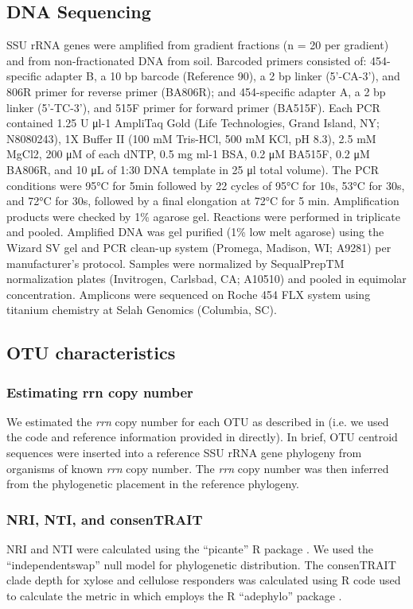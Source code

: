 \documentclass{article}
\begin{document}
\subsection{DNA Sequencing} 
SSU rRNA genes were amplified from gradient fractions (n = 20 per gradient) and
from non-fractionated DNA from soil. Barcoded primers consisted of:
454-specific adapter B, a 10 bp barcode (Reference 90), a 2 bp linker
(5’-CA-3’), and 806R primer for reverse primer (BA806R); and 454-specific
adapter A, a 2 bp linker (5’-TC-3’), and 515F primer for forward primer
(BA515F). Each PCR contained 1.25 U μl-1 AmpliTaq Gold (Life Technologies,
Grand Island, NY; N8080243), 1X Buffer II (100 mM Tris-HCl, 500 mM KCl, pH
8.3), 2.5 mM MgCl2, 200 μM of each dNTP, 0.5 mg ml-1 BSA, 0.2 μM BA515F, 0.2 μM
BA806R, and 10 μL of 1:30 DNA template in 25 μl total volume). The PCR
conditions were 95°C for 5min followed by 22 cycles of 95°C for 10s, 53°C for
30s, and 72°C for 30s, followed by a final elongation at 72°C for 5 min.
Amplification products were checked by 1\% agarose gel. Reactions were
performed in triplicate and pooled. Amplified DNA was gel purified (1\% low
melt agarose) using the Wizard SV gel and PCR clean-up system (Promega,
Madison, WI; A9281) per manufacturer’s protocol. Samples were normalized by
SequalPrepTM normalization plates (Invitrogen, Carlsbad, CA; A10510) and pooled
in equimolar concentration. Amplicons were sequenced on Roche 454 FLX system
using titanium chemistry at Selah Genomics (Columbia, SC).

\subsection{OTU characteristics} 
\subsubsection{Estimating rrn copy number}
We estimated the \textit{rrn} copy number for each OTU as described in \citet{Kembel_2012}
(i.e. we used the code and reference information provided in \citet{Kembel_2012}
directly). In brief, OTU centroid sequences were inserted into a reference SSU
rRNA gene phylogeny \citep{matsen2010} from organisms of known \textit{rrn} copy number.
The \textit{rrn} copy number was then inferred from the phylogenetic placement
in the reference phylogeny. 

\subsubsection{NRI, NTI, and consenTRAIT}
NRI and NTI were calculated using the ``picante'' R package
\citep{kembel2010}. We used the ``independentswap'' null model for
phylogenetic distribution. The consenTRAIT clade depth for xylose and cellulose
responders was calculated using R code used to calculate the metric in
\citet{Martiny2013} which employs the R ``adephylo'' package
\citep{jombart2010}.
\end{document}
